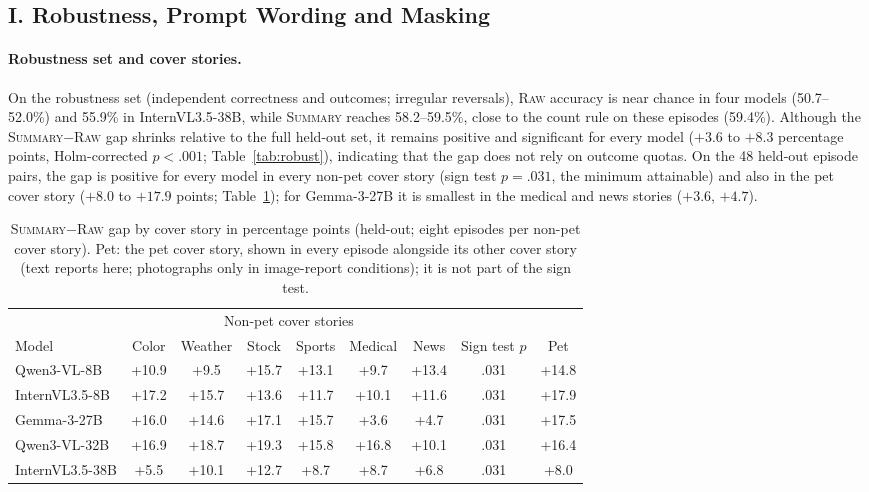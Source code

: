 \documentclass[letterpaper]{article} %
\newcommand{\Raw}{\textsc{Raw}}
\newcommand{\Summary}{\textsc{Summary}}
\begin{document}
\subsection{I. Robustness, Prompt Wording and Masking}
\paragraph{Robustness set and cover stories.} On the robustness set (independent correctness and outcomes; irregular reversals), \Raw{} accuracy is near chance in four models (50.7--52.0\%) and 55.9\% in InternVL3.5-38B, while \Summary{} reaches 58.2--59.5\%, close to the count rule on these episodes (59.4\%). Although the \Summary{}$-$\Raw{} gap shrinks relative to the full held-out set, it remains positive and significant for every model ($+3.6$ to $+8.3$ percentage points, Holm-corrected $p<.001$; Table~\ref{tab:robust}), indicating that the gap does not rely on outcome quotas. On the 48 held-out episode pairs, the gap is positive for every model in every non-pet cover story (sign test $p=.031$, the minimum attainable) and also in the pet cover story ($+8.0$ to $+17.9$ points; Table~\ref{tab:scenario}); for Gemma-3-27B it is smallest in the medical and news stories ($+3.6$, $+4.7$).

\begin{table}[!t]\centering\small
  \setlength{\tabcolsep}{4pt}
  \begin{tabular}{l cccccc c c}
    \toprule
    & \multicolumn{6}{c}{Non-pet cover stories} & & \\
    \cmidrule(lr){2-7}
    Model & Color & Weather & Stock & Sports & Medical & News & Sign test $p$ & Pet \\
    \midrule
    Qwen3-VL-8B & +10.9 & +9.5 & +15.7 & +13.1 & +9.7 & +13.4 & .031 & +14.8 \\
    InternVL3.5-8B & +17.2 & +15.7 & +13.6 & +11.7 & +10.1 & +11.6 & .031 & +17.9 \\
    Gemma-3-27B & +16.0 & +14.6 & +17.1 & +15.7 & +3.6 & +4.7 & .031 & +17.5 \\
    Qwen3-VL-32B & +16.9 & +18.7 & +19.3 & +15.8 & +16.8 & +10.1 & .031 & +16.4 \\
    InternVL3.5-38B & +5.5 & +10.1 & +12.7 & +8.7 & +8.7 & +6.8 & .031 & +8.0 \\
    \bottomrule
  \end{tabular}
  \caption{\Summary{}$-$\Raw{} gap by cover story in percentage points (held-out; eight episodes per non-pet cover story). Pet: the pet cover story, shown in every episode alongside its other cover story (text reports here; photographs only in image-report conditions); it is not part of the sign test.}
  \label{tab:scenario}
\end{table}
\end{document}
